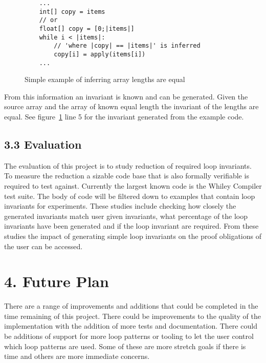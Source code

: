 \documentclass[11pt, a4paper, twoside, openright]{report}
\begin{document}
\begin{figure}[ht]
\begin{lstlisting}
    ...
    int[] copy = items
    // or
    float[] copy = [0;|items|]
    while i < |items|:
        // 'where |copy| == |items|' is inferred
        copy[i] = apply(items[i])
    ...
\end{lstlisting}
\caption{Simple example of inferring array lengths are equal}
\label{lst:whiley-length}
\end{figure}

From this information an invariant is known and can be generated.
Given the source array and the array of known equal length the
invariant of the lengths are equal.
See figure~\ref{lst:whiley-length} line 5 for the invariant generated
from the example code.

\subsection*{3.3 Evaluation}

The evaluation of this project is to study reduction of required loop
invariants.
To measure the reduction a sizable code base that is also formally verifiable
is required to test against.
Currently the largest known code is the Whiley Compiler test suite.
The body of code will be filtered down to examples that contain loop
invariants for experiments.
These studies include checking how closely the generated invariants match
user given invariants,
what percentage of the loop invariants have been generated
and if the loop invariant are required.
From these studies the impact of generating simple loop invariants on
the proof obligations of the user can be accessed.

\section*{4. Future Plan}

There are a range of improvements and additions that could be completed in
the time remaining of this project.
There could be improvements to the quality of the implementation with
the addition of more tests and documentation.
There could be additions of support for more loop patterns or tooling
to let the user control which loop patterns are used.
Some of these are more stretch goals if there is time and
others are more immediate concerns.
\end{document}
